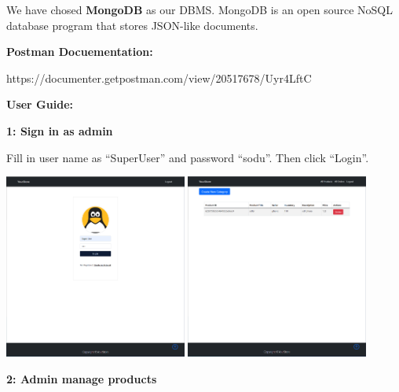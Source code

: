 \documentclass[12pt]{article}
\begin{document}
    We have chosed \textbf{MongoDB} as our DBMS. MongoDB is an open source NoSQL database program
    that stores JSON-like documents.


    












\newpage

\textbf{Postman Docuementation:}

\begin{center}
    https://documenter.getpostman.com/view/20517678/Uyr4LftC
\end{center}

\newpage 
\textbf{User Guide:}

\vspace*{5mm}
\textbf{1: Sign in as admin}

Fill in user name as “SuperUser” and password “sodu”. Then click “Login”.

\includegraphics[width=0.45\textwidth]{UserGuideImage/1.png}
\includegraphics[width=0.45\textwidth]{UserGuideImage/2.png}

\vspace*{5mm}
\textbf{2: Admin manage products}
\end{document}
